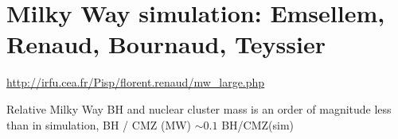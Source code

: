 \section{Milky Way simulation: Emsellem, Renaud, Bournaud, Teyssier}

\url{http://irfu.cea.fr/Pisp/florent.renaud/mw_large.php}

Relative Milky Way BH and nuclear cluster mass is an order of magnitude less than in simulation, BH / CMZ (MW) $\sim0.1$ BH/CMZ(sim)